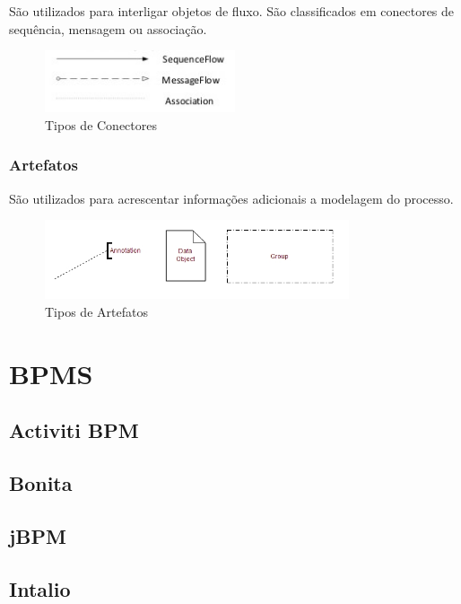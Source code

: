     São utilizados para interligar objetos de fluxo. São classificados em conectores de sequência, mensagem ou associação.

    \begin{figure}[H]
    \centering
    \includegraphics[width=0.5\textwidth]{imagens/bpmn_connectors.jpg}
    \caption{Tipos de Conectores}
    \label{fig:bpmn_conectors}
    \end{figure}

\subsubsection{Artefatos}\label{sec:automatizacao_processos-bpmn_objetos_artefatos}

    São utilizados para acrescentar informações adicionais a modelagem do processo. 

    \begin{figure}[H]
    \centering
    \includegraphics[width=0.8\textwidth]{imagens/bpmn_artifacts.jpg}
    \caption{Tipos de Artefatos}
    \label{fig:bpmn_artifacts}
    \end{figure}

\section{BPMS}\label{sec:automatizacao-processos-bpms}
\subsection{Activiti BPM}\label{sec:automatizacao-processos-bpms-activiti}
\subsection{Bonita}\label{sec:automatizacao-processos-bpms-bonita}
\subsection{jBPM}\label{sec:automatizacao-processos-bpms-jbpm}
\subsection{Intalio}\label{sec:automatizacao-processos-bpms-intalio}
